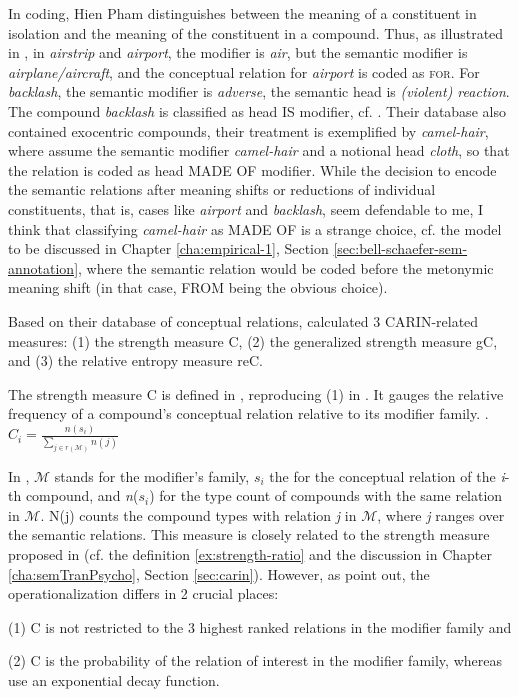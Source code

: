 In coding, Hien Pham distinguishes between the meaning of a
constituent in isolation and the meaning of the constituent in a
compound. Thus, as illustrated in \citet[461]{PhamandBaayen:2013}, in \emph{airstrip} and \emph{airport}, the modifier
is \emph{air}, but the semantic modifier is \emph{airplane/aircraft},
and the conceptual relation for \emph{airport} is coded as \textsc{for}.
For \emph{backlash}, the semantic modifier is \emph{adverse}, the
semantic head is \emph{(violent) reaction}. The compound \emph{backlash} is
classified as head IS modifier, cf. \citet[461]{PhamandBaayen:2013}. Their database also
contained exocentric compounds, their treatment is exemplified by
\emph{camel-hair}, where \citet[462]{PhamandBaayen:2013} assume the
semantic modifier \emph{camel-hair} and a notional head \emph{cloth},
so that the relation is coded as head MADE OF modifier. While the
decision to encode the semantic relations after meaning shifts or
reductions of
individual constituents, that is, cases like \emph{airport} and
\emph{backlash}, seem defendable to me, I think that classifying
\emph{camel-hair} as MADE OF is a strange choice, cf. the model to be
discussed in Chapter \ref{cha:empirical-1}, Section \ref{sec:bell-schaefer-sem-annotation}, where the semantic relation
would be coded before the metonymic meaning shift (in that case, FROM
being the obvious choice). 

\pagebreak[4]
Based on their database of conceptual relations, \citet{PhamandBaayen:2013} cal\-cu\-lat\-ed 3
CARIN-related measures: (1) the strength measure C, (2) the gen\-er\-al\-ized
strength measure gC, and (3) the relative entropy measure reC.

The strength measure C is defined in \Next, reproducing (1) in
\citet{PhamandBaayen:2013}. It gauges the relative frequency of a
compound's conceptual relation relative to its modifier family.
\ex. \label{ex:strength-C}
\( \displaystyle C_i = \frac{n(s_i)}{\sum_{j \in r(\mathcal{M})} n(j)} \)

\enlargethispage{1\baselineskip}
In \Last, $\mathcal{M}$ stands for the modifier's family, $s_i$ the for the
conceptual relation of the \emph{i}-th compound, and \emph{n}($s_i$) for the type count
of compounds with the same relation in $\mathcal{M}$. N(j) counts the
compound types with relation \emph{j} in $\mathcal{M}$, where \emph{j} ranges over the
semantic relations. This measure
is closely related to the strength measure proposed in
\citet{GagneandShoben:1997} (cf. the definition
\ref{ex:strength-ratio} and the discussion in Chapter
\ref{cha:semTranPsycho}, Section \ref{sec:carin}). 
However, as
\citet[458]{PhamandBaayen:2013} point out, the
operationalization differs in 2 crucial places:
\begin{inparaenum}
\item[(1)] C is not
restricted to the 3 highest ranked relations in the modifier
family and
\item[(2)] C is the probability of the relation of interest in the modifier
  family, whereas \citet{GagneandShoben:1997} use an exponential decay function.
\end{inparaenum}

